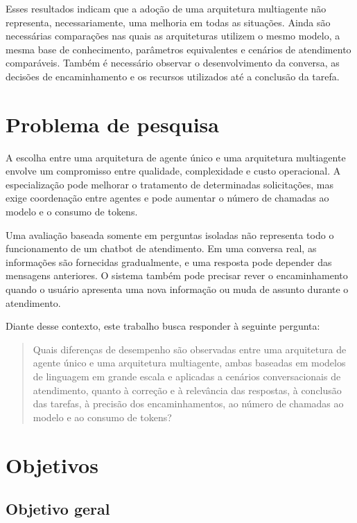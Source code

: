 Esses resultados indicam que a adoção de uma arquitetura multiagente não representa, necessariamente, uma melhoria em todas as situações. Ainda são necessárias comparações nas quais as arquiteturas utilizem o mesmo modelo, a mesma base de conhecimento, parâmetros equivalentes e cenários de atendimento comparáveis. Também é necessário observar o desenvolvimento da conversa, as decisões de encaminhamento e os recursos utilizados até a conclusão da tarefa.

\section{Problema de pesquisa}\label{sec:problema}

A escolha entre uma arquitetura de agente único e uma arquitetura multiagente envolve um compromisso entre qualidade, complexidade e custo operacional. A especialização pode melhorar o tratamento de determinadas solicitações, mas exige coordenação entre agentes e pode aumentar o número de chamadas ao modelo e o consumo de tokens.

Uma avaliação baseada somente em perguntas isoladas não representa todo o funcionamento de um chatbot de atendimento. Em uma conversa real, as informações são fornecidas gradualmente, e uma resposta pode depender das mensagens anteriores. O sistema também pode precisar rever o encaminhamento quando o usuário apresenta uma nova informação ou muda de assunto durante o atendimento.

Diante desse contexto, este trabalho busca responder à seguinte pergunta:

\begin{quote}
Quais diferenças de desempenho são observadas entre uma arquitetura de agente único e uma arquitetura multiagente, ambas baseadas em modelos de linguagem em grande escala e aplicadas a cenários conversacionais de atendimento, quanto à correção e à relevância das respostas, à conclusão das tarefas, à precisão dos encaminhamentos, ao número de chamadas ao modelo e ao consumo de tokens?
\end{quote}

\section{Objetivos}\label{sec:objetivos}

\subsection{Objetivo geral}\label{subsec:objetivo-geral}

